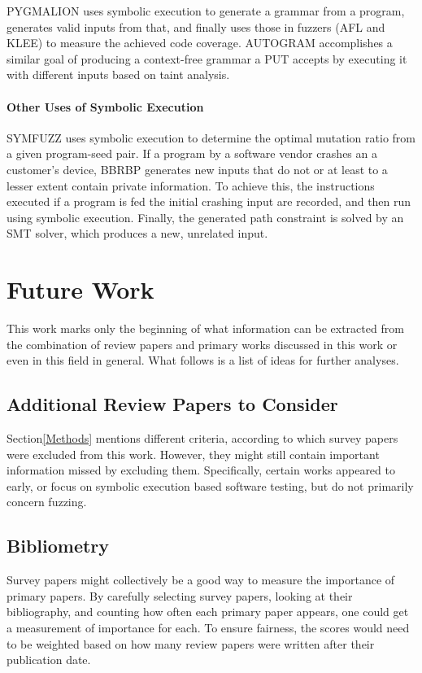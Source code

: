 \documentclass{article}
\begin{document}
\begin{multicols}{2}
    PYGMALION\cite{PYGMALION} uses symbolic execution to generate a grammar from a program, generates valid inputs from that, and finally uses those in fuzzers (AFL\cite{AFLPlusPlus} and KLEE\cite{KLEE}) to measure the achieved code coverage. AUTOGRAM\cite{AUTOGRAM} accomplishes a similar goal of producing a context-free grammar a PUT accepts by executing it with different inputs based on taint analysis.

    \paragraph{Other Uses of Symbolic Execution} SYMFUZZ\cite{SYMFUZZ} uses symbolic execution to determine the optimal mutation ratio from a given program-seed pair. If a program by a software vendor crashes an a customer's device, BBRBP\cite{BBRBP} generates new inputs that do not or at least to a lesser extent contain private information. To achieve this, the instructions executed if a program is fed the initial crashing input are recorded, and then run using symbolic execution. Finally, the generated path constraint is solved by an SMT solver, which produces a new, unrelated input.

    \section{Future Work}
    \label{FutureWork}
    This work marks only the beginning of what information can be extracted from the combination of review papers and primary works discussed in this work or even in this field in general. What follows is a list of ideas for further analyses.

    \subsection{Additional Review Papers to Consider}
    Section\ref{Methods} mentions different criteria, according to which survey papers were excluded from this work. However, they might still contain important information missed by excluding them. Specifically, certain works appeared to early\cite{AutomaticTestDataGeneration, BruteForceVulnDiscovery,BreakingSoftware}, or focus on symbolic execution based software testing, but do not primarily concern fuzzing\cite{DSETestGeneration, SurveySymbex, SearchStrategies, NewTrendsSymbex, ReviewConcolicTesting}.

    \subsection{Bibliometry}
    Survey papers might collectively be a good way to measure the importance of primary papers. By carefully selecting survey papers, looking at their bibliography, and counting how often each primary paper appears, one could get a measurement of importance for each. To ensure fairness, the scores would need to be weighted based on how many review papers were written after their publication date.


\end{multicols}
\end{document}
